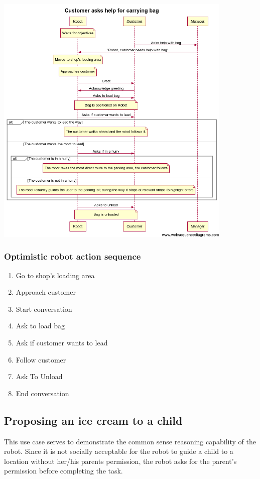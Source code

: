 \includegraphics[width=0.85\textwidth]{bagUseCase}


\subsubsection{Optimistic robot action sequence}
\begin{enumerate}
\item Go to shop's loading area
\item Approach customer
\item Start conversation
\item Ask to load bag
\item Ask if customer wants to lead
\item Follow customer
\item Ask To Unload
\item End conversation
\end{enumerate}


\subsection{Proposing an ice cream to a child}

This use case serves to demonstrate the common sense reasoning capability
of the robot. Since it is not socially acceptable for the robot to guide
a child to a location without her/his parents permission, the robot
asks for the parent's permission before completing the task.

